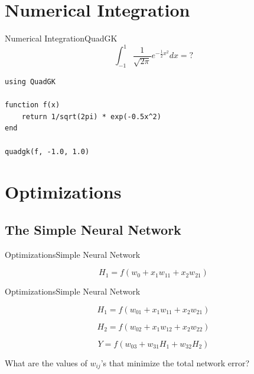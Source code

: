 \documentclass[11pt]{beamer}
\begin{document}
\section{Numerical Integration}
\begin{frame}[fragile]{Numerical Integration}{QuadGK}
\begin{equation}
\int_{-1}^{1} \frac{1}{\sqrt{2\pi}} e^{-\frac{1}{2}x^2} dx = ?
\end{equation}
\begin{lstlisting}
using QuadGK

function f(x)
	return 1/sqrt(2pi) * exp(-0.5x^2)
end 

quadgk(f, -1.0, 1.0)
\end{lstlisting}
\end{frame}

\section{Optimizations}

\subsection{The Simple Neural Network}
\begin{frame}[fragile]{Optimizations}{Simple Neural Network}
\begin{center}
$$
H_1 = f(w_0 + x_1w_{11} + x_2w_{21})
$$
\end{center}
\end{frame}

\begin{frame}[fragile]{Optimizations}{Simple Neural Network}

$$
H_1 = f(w_{01} + x_1w_{11} + x_2w_{21})
$$

$$
H_2 = f(w_{02} + x_1w_{12} + x_2w_{22})
$$

$$
Y = f(w_{03} + w_{31}H_1 + w_{32}H_2)
$$

What are the values of $w_{ij}$'s that minimize the total network error?
\end{frame}
\end{document}
